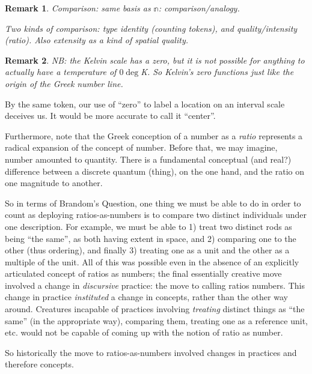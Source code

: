 \documentclass[11pt,twoside]{article}
\newtheorem{remark}{Remark}
\begin{document}
\begin{remark}
  Comparison: same basis as \(\mathbb{n}\): comparison/analogy.

Two kinds of comparison: type identity (counting tokens), and
quality/intensity (ratio).  Also extensity as a kind of spatial
quality.

\end{remark}

\begin{remark}
  NB: the Kelvin scale has a zero, but it is not possible for anything
  to actually have a temperature of $0\deg$K.  So Kelvin's zero
  functions just like the origin of the Greek number line.
\end{remark}

By the same token, our use of ``zero'' to label a location on an
interval scale deceives us.  It would be more accurate to call it
``center''.

Furthermore, note that the Greek conception of a number as a
\textit{ratio} represents a radical expansion of the concept of
number.  Before that, we may imagine, number amounted to quantity.
There is a fundamental conceptual (and real?) difference between a
discrete quantum (thing), on the one hand, and the ratio on one
magnitude to another.

So in terms of Brandom's Question, one thing we must be able to do in
order to count as deploying ratios-as-numbers is to compare two
distinct individuals under one description.  For example, we must be
able to 1) treat two distinct rods as being ``the same'', as both
having extent in space, and 2) comparing one to the other (thus
ordering), and finally 3) treating one as a unit and the other as a
multiple of the unit.  All of this was possible even in the absence of
an explicitly articulated concept of ratios as numbers; the final
essentially creative move involved a change in \textit{discursive}
practice: the move to calling ratios numbers.  This change in practice
\textit{instituted} a change in concepts, rather than the other way
around.  Creatures incapable of practices involving \textit{treating}
distinct things as ``the same'' (in the appropriate way), comparing
them, treating one as a reference unit, etc. would not be capable of
coming up with the notion of ratio as number.

So historically the move to ratios-as-numbers involved changes in
practices and therefore concepts.
\end{document}
